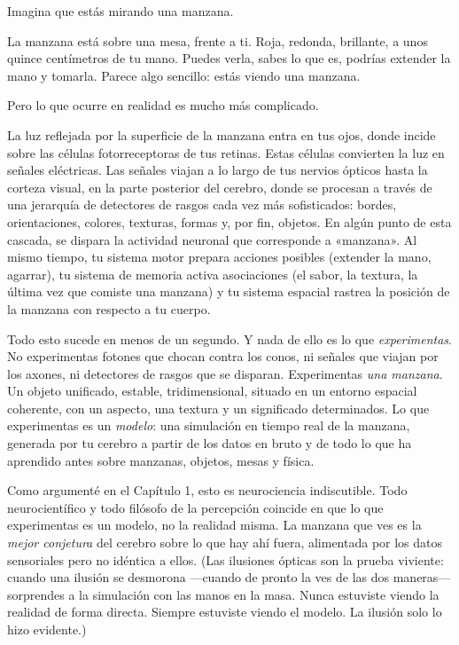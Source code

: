 \documentclass[11pt, twoside, openright]{book}
\begin{document}
Imagina que estás mirando una manzana.

La manzana está sobre una mesa, frente a ti. Roja, redonda, brillante, a unos quince centímetros de tu mano. Puedes verla, sabes lo que es, podrías extender la mano y tomarla. Parece algo sencillo: estás viendo una manzana.

Pero lo que ocurre en realidad es mucho más complicado.

La luz reflejada por la superficie de la manzana entra en tus ojos, donde incide sobre las células fotorreceptoras de tus retinas. Estas células convierten la luz en señales eléctricas. Las señales viajan a lo largo de tus nervios ópticos hasta la corteza visual, en la parte posterior del cerebro, donde se procesan a través de una jerarquía de detectores de rasgos cada vez más sofisticados: bordes, orientaciones, colores, texturas, formas y, por fin, objetos. En algún punto de esta cascada, se dispara la actividad neuronal que corresponde a «manzana». Al mismo tiempo, tu sistema motor prepara acciones posibles (extender la mano, agarrar), tu sistema de memoria activa asociaciones (el sabor, la textura, la última vez que comiste una manzana) y tu sistema espacial rastrea la posición de la manzana con respecto a tu cuerpo.

Todo esto sucede en menos de un segundo. Y nada de ello es lo que \textit{experimentas}. No experimentas fotones que chocan contra los conos, ni señales que viajan por los axones, ni detectores de rasgos que se disparan. Experimentas \textit{una manzana}. Un objeto unificado, estable, tridimensional, situado en un entorno espacial coherente, con un aspecto, una textura y un significado determinados. Lo que experimentas es un \textit{modelo}: una simulación en tiempo real de la manzana, generada por tu cerebro a partir de los datos en bruto y de todo lo que ha aprendido antes sobre manzanas, objetos, mesas y física.

Como argumenté en el Capítulo 1, esto es neurociencia indiscutible. Todo neurocientífico y todo filósofo de la percepción coincide en que lo que experimentas es un modelo, no la realidad misma. La manzana que ves es la \textit{mejor conjetura} del cerebro sobre lo que hay ahí fuera, alimentada por los datos sensoriales pero no idéntica a ellos. (Las ilusiones ópticas son la prueba viviente: cuando una ilusión se desmorona ---cuando de pronto la ves de las dos maneras--- sorprendes a la simulación con las manos en la masa. Nunca estuviste viendo la realidad de forma directa. Siempre estuviste viendo el modelo. La ilusión solo lo hizo evidente.)
\end{document}
